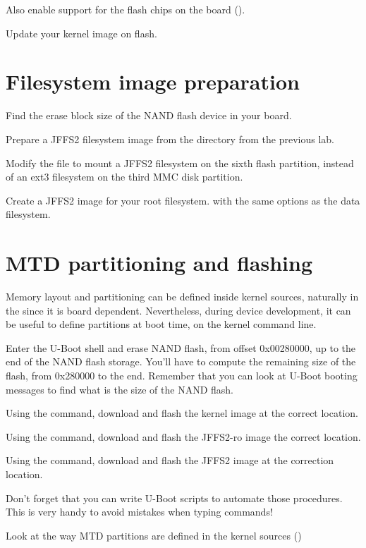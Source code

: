Also enable support for the flash chips on the board
().

Update your kernel image on flash.

\section{Filesystem image preparation}

Find the erase block size of the NAND flash device in your board.

Prepare a JFFS2 filesystem image from the 
directory from the previous lab.

Modify the  file to mount a JFFS2 filesystem on
the sixth flash partition, instead of an ext3 filesystem on the third
MMC disk partition.

Create a JFFS2 image for your root filesystem. with the same options
as the data filesystem.

\section{MTD partitioning and flashing}

Memory layout and partitioning can be defined inside kernel sources,
naturally in the  since it is
board dependent. Nevertheless, during device development, it can be
useful to define partitions at boot time, on the kernel command line.

Enter the U-Boot shell and erase NAND flash, from offset 0x00280000,
up to the end of the NAND flash storage. You'll have to compute the
remaining size of the flash, from 0x280000 to the end. Remember that
you can look at U-Boot booting messages to find what is the size of
the NAND flash.

Using the  command, download and flash the kernel image at
the correct location.

Using the  command, download and flash the JFFS2-ro image
the correct location.

Using the  command, download and flash the JFFS2 image at
the correction location.

Don't forget that you can write U-Boot scripts to automate those
procedures. This is very handy to avoid mistakes when typing commands!

Look at the way MTD partitions are defined in the kernel sources
()

